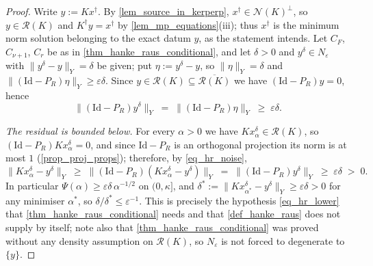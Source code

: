 \documentclass[a4paper]{report}
\theoremstyle{plain}
\theoremstyle{definition}
\theoremstyle{remark}
\newcommand{\Ran}{\mathcal{R}}
\newcommand{\Ker}{\mathcal{N}}
\newcommand{\Id}{\mathrm{Id}}
\newcommand{\dg}{^{\dagger}}
\begin{document}
\begin{proof}
  Write $y := Kx\dg$.  By \cref{lem_source_in_kerperp}, $x\dg \in \Ker(K)^{\perp}$, so
  $y \in \Ran(K)$ and $K\dg y = x\dg$ by \cref{lem_mp_equations}(iii); thus $x\dg$ is the
  minimum norm solution belonging to the exact datum $y$, as the statement intends.
  Let $C_F$, $C_{\nu+1}$, $C_r$ be as in \cref{thm_hanke_raus_conditional}, and let
  $\delta > 0$ and $y^{\delta} \in N_{\varepsilon}$ with $\|y^{\delta} - y\|_Y = \delta$
  be given; put $\eta := y^{\delta} - y$, so $\|\eta\|_Y = \delta$ and
  $\|(\Id - P_R)\eta\|_Y \ge \varepsilon\delta$.  Since $y \in \Ran(K) \subseteq
  \overline{\Ran(K)}$ we have $(\Id - P_R)y = 0$, hence
  \begin{equation}\label{eq_hr_noise}
    \|(\Id - P_R)y^{\delta}\|_Y \;=\; \|(\Id - P_R)\eta\|_Y \;\ge\; \varepsilon\delta .
  \end{equation}

  \emph{The residual is bounded below.}  For every $\alpha > 0$ we have
  $Kx^{\delta}_{\alpha} \in \Ran(K)$, so $(\Id - P_R)Kx^{\delta}_{\alpha} = 0$, and since
  $\Id - P_R$ is an orthogonal projection its norm is at most $1$
  (\cref{prop_proj_props}); therefore, by \eqref{eq_hr_noise},
  \begin{equation}\label{eq_hr_lower}
    \|Kx^{\delta}_{\alpha} - y^{\delta}\|_Y \;\ge\;
      \|(\Id - P_R)(Kx^{\delta}_{\alpha} - y^{\delta})\|_Y
      \;=\; \|(\Id - P_R)y^{\delta}\|_Y \;\ge\; \varepsilon\delta \;>\; 0 .
  \end{equation}
  In particular $\Psi(\alpha) \ge \varepsilon\delta\,\alpha^{-1/2}$ on $(0,\kappa]$, and
  $\delta^{*} := \|Kx^{\delta}_{\alpha^{*}} - y^{\delta}\|_Y \ge \varepsilon\delta > 0$
  for any minimiser $\alpha^{*}$, so $\delta/\delta^{*} \le \varepsilon^{-1}$.  This is
  precisely the hypothesis \eqref{eq_hr_lower} that
  \cref{thm_hanke_raus_conditional} needs and that
  \cref{def_hanke_raus} does not supply by itself; note also that
  \cref{thm_hanke_raus_conditional} was proved without any density assumption on
  $\Ran(K)$, so $N_{\varepsilon}$ is not forced to degenerate to $\{y\}$.


\end{proof}
\end{document}
